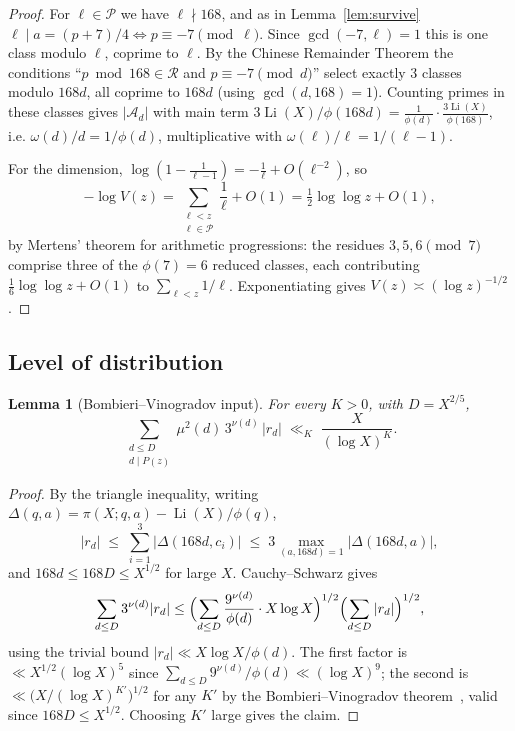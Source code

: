 \documentclass[12pt]{amsart}
\newtheorem{lemma}[theorem]{Lemma}
\theoremstyle{definition}
\theoremstyle{remark}
\begin{document}
\begin{proof}
For $\ell \in \mathcal{P}$ we have $\ell \nmid 168$, and as in
Lemma~\ref{lem:survive} $\ell \mid a = (p+7)/4 \iff p \equiv -7 \pmod \ell$.
Since $\gcd(-7, \ell) = 1$ this is one class modulo $\ell$, coprime
to $\ell$. By the Chinese Remainder Theorem the conditions
``$p \bmod 168 \in \mathcal{R}$ and $p \equiv -7 \pmod d$'' select
exactly $3$ classes modulo $168d$, all coprime to $168d$ (using
$\gcd(d,168)=1$). Counting primes in these classes gives $|\mathcal{A}_d|$
with main term
$3\operatorname{Li}(X)/\phi(168d)
= \tfrac{1}{\phi(d)} \cdot \tfrac{3\operatorname{Li}(X)}{\phi(168)}$,
i.e. $\omega(d)/d = 1/\phi(d)$, multiplicative with
$\omega(\ell)/\ell = 1/(\ell-1)$.

For the dimension,
$\log(1 - \tfrac{1}{\ell-1}) = -\tfrac{1}{\ell} + O(\ell^{-2})$, so
\[
  -\log V(z)
  = \sum_{\substack{\ell < z \\ \ell \in \mathcal{P}}} \frac{1}{\ell} + O(1)
  = \tfrac12 \log\log z + O(1),
\]
by Mertens' theorem for arithmetic progressions: the residues
$3, 5, 6 \pmod 7$ comprise three of the $\phi(7) = 6$ reduced classes,
each contributing $\tfrac16 \log\log z + O(1)$ to
$\sum_{\ell < z} 1/\ell$. Exponentiating gives $V(z) \asymp (\log z)^{-1/2}$.
\end{proof}

\subsection{Level of distribution}

\begin{lemma}[Bombieri--Vinogradov input]\label{lem:bv}
For every $K > 0$, with $D = X^{2/5}$,
\[
  \sum_{\substack{d \le D \\ d \mid P(z)}}
  \mu^2(d)\, 3^{\nu(d)}\, |r_d|
  \;\ll_K\; \frac{X}{(\log X)^{K}}.
\]
\end{lemma}

\begin{proof}
By the triangle inequality, writing
$\Delta(q, a) = \pi(X; q, a) - \operatorname{Li}(X)/\phi(q)$,
\[
  |r_d| \;\le\; \sum_{i=1}^{3} |\Delta(168d, c_i)|
  \;\le\; 3 \max_{(a, 168d)=1} |\Delta(168d, a)|,
\]
and $168d \le 168 D \le X^{1/2}$ for large $X$. Cauchy--Schwarz gives
\[
  \sum_{d \le D} 3^{\nu(d)} |r_d|
  \le \Bigl(\sum_{d \le D} \frac{9^{\nu(d)}}{\phi(d)} \cdot X \log X\Bigr)^{1/2}
      \Bigl(\sum_{d \le D} |r_d|\Bigr)^{1/2},
\]
using the trivial bound $|r_d| \ll X \log X / \phi(d)$. The first factor
is $\ll X^{1/2} (\log X)^{5}$ since
$\sum_{d \le D} 9^{\nu(d)}/\phi(d) \ll (\log X)^{9}$; the second is
$\ll \bigl(X/(\log X)^{K'}\bigr)^{1/2}$ for any $K'$ by the
Bombieri--Vinogradov theorem~\cite[Thm.~17.1]{Iwaniec-Kowalski},
valid since $168 D \le X^{1/2}$. Choosing $K'$ large gives the claim.
\end{proof}
\end{document}
